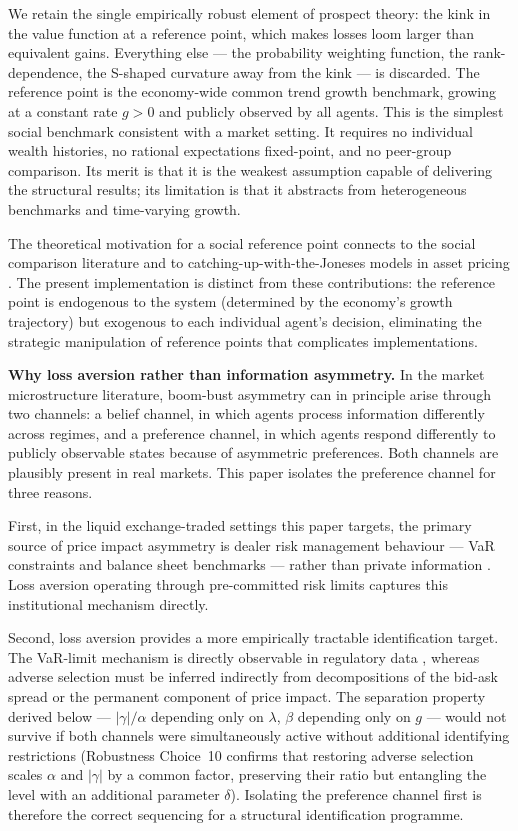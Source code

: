 \documentclass[12pt,a4paper]{article}
\theoremstyle{definition}
\begin{document}
We retain the single empirically robust element of prospect theory: the kink
in the value function at a reference point, which makes losses loom larger
than equivalent gains. Everything else --- the probability weighting function,
the rank-dependence, the S-shaped curvature away from the kink --- is discarded.
The reference point is the economy-wide common trend growth benchmark, growing
at a constant rate $g > 0$ and publicly observed by all agents. This is the
simplest social benchmark consistent with a market setting. It requires no
individual wealth histories, no rational expectations fixed-point, and no
peer-group comparison. Its merit is that it is the weakest assumption capable
of delivering the structural results; its limitation is that it abstracts from
heterogeneous benchmarks and time-varying growth.

The theoretical motivation for a social reference point connects to the
social comparison literature \citep{festinger1954,fehr1999} and
to catching-up-with-the-Joneses models in asset pricing \citep{abel1990,campbell1999}. The present implementation is distinct from these
contributions: the reference point is endogenous to the system (determined
by the economy's growth trajectory) but exogenous to each individual agent's
decision, eliminating the strategic manipulation of reference points that
complicates \citet{koszegi2006,koszegi2007} implementations.

\medskip\noindent\textbf{Why loss aversion rather than information asymmetry.}
In the market microstructure literature, boom-bust asymmetry can in principle
arise through two channels: a belief channel, in which agents process
information differently across regimes, and a preference channel, in which
agents respond differently to publicly observable states because of
asymmetric preferences. Both channels are plausibly present in real markets.
This paper isolates the preference channel for three reasons.

First, in the liquid exchange-traded settings this paper targets, the primary
source of price impact asymmetry is dealer risk management behaviour ---
VaR constraints and balance sheet benchmarks --- rather than private
information \citep{adrian2014,li2025}. Loss aversion operating through
pre-committed risk limits captures this institutional mechanism directly.

Second, loss aversion provides a more empirically tractable identification
target. The VaR-limit mechanism is directly observable in regulatory data
\citep{li2025}, whereas adverse selection must be inferred indirectly from
decompositions of the bid-ask spread or the permanent component of price
impact. The separation property derived below --- $|\gamma|/\alpha$
depending only on $\lambda$, $\beta$ depending only on $g$ --- would not
survive if both channels were simultaneously active without additional
identifying restrictions (Robustness Choice~10 confirms that restoring
adverse selection scales $\alpha$ and $|\gamma|$ by a common factor,
preserving their ratio but entangling the level with an additional
parameter $\delta$). Isolating the preference channel first is therefore
the correct sequencing for a structural identification programme.
\end{document}
